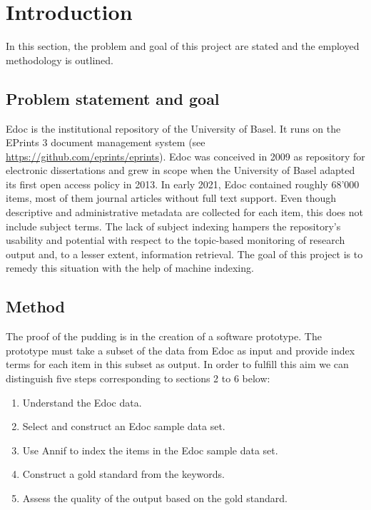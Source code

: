 \hypertarget{introduction}{%
\section{Introduction}\label{introduction}}

In this section, the problem and goal of this project are stated and the
employed methodology is outlined.

\hypertarget{problem-statement-and-goal}{%
\subsection{Problem statement and
goal}\label{problem-statement-and-goal}}

Edoc is the institutional repository of the University of Basel. It runs
on the EPrints 3 document management system (see
\url{https://github.com/eprints/eprints}). Edoc was conceived in 2009 as
repository for electronic dissertations and grew in scope when the
University of Basel adapted its first open access policy in 2013. In
early 2021, Edoc contained roughly 68'000 items, most of them journal
articles without full text support. Even though descriptive and
administrative metadata are collected for each item, this does not
include subject terms. The lack of subject indexing hampers the
repository's usability and potential with respect to the topic-based
monitoring of research output and, to a lesser extent, information
retrieval. The goal of this project is to remedy this situation with the
help of machine indexing.

\hypertarget{method}{%
\subsection{Method}\label{method}}

The proof of the pudding is in the creation of a software prototype. The
prototype must take a subset of the data from Edoc as input and provide
index terms for each item in this subset as output. In order to fulfill
this aim we can distinguish five steps corresponding to sections 2 to 6
below:

\begin{enumerate}
\def\labelenumi{\arabic{enumi}.}
\tightlist
\item
  Understand the Edoc data.
\item
  Select and construct an Edoc sample data set.
\item
  Use Annif to index the items in the Edoc sample data set.
\item
  Construct a gold standard from the keywords.
\item
  Assess the quality of the output based on the gold standard.
\end{enumerate}

